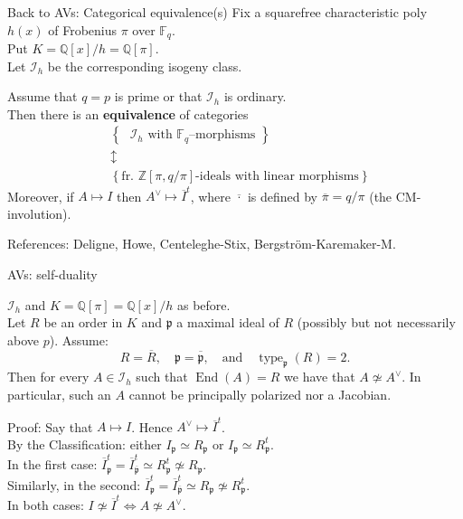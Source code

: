 \documentclass[usenames,dvipsnames,handout]{beamer}
\def\Q{\mathbb{Q}}
\def\Z{\mathbb{Z}}
\def\F{\mathbb{F}}
\DeclareMathOperator{\End}{End}
\DeclareMathOperator{\type}{type}
\newcommand{\p}{{\mathfrak p}}
\newcommand{\set}[1]{\left\lbrace#1\right\rbrace }
\begin{document}
\begin{frame}{ Back to AVs: Categorical equivalence(s) }
    Fix a squarefree characteristic poly $h(x)$ of Frobenius $\pi$ over $\F_q$.\\
    Put $K=\Q[x]/h=\Q[\pi]$.\\
    Let $\mathcal{I}_h$ be the corresponding isogeny class.
    \pause 
    \begin{theorem}
        Assume that $q=p$ is prime or that $\mathcal{I}_h$ is ordinary.\\
        \pause Then there is an {\bf equivalence} of categories
        \[
        \begin{array}{cc}
        & \set{ \text{ $\mathcal{I}_h$ with $\F_q$--morphisms } }  \\
        & \updownarrow \\ 
        & \set{ \text{fr.~$\Z[\pi,q/\pi]$-ideals with linear morphisms} }
        \end{array} 
        \]  
        \pause Moreover, if $A\mapsto I$ then $A^\vee \mapsto \overline{I}^t$, where $\overline{\cdot}$ is defined by $\overline{\pi}=q/\pi$ (the CM-involution).
    \end{theorem}
    \pause References: Deligne, Howe, Centeleghe-Stix, Bergstr\"om-Karemaker-M.
\end{frame}

\begin{frame}{ AVs: self-duality }
    \begin{theorem}[ Springer-M. ]
        $\mathcal{I}_h$ and $K=\Q[\pi]=\Q[x]/h$ as before.\\
        \pause Let $R$ be an order in $K$ and $\p$ a maximal ideal of $R$ (possibly but not necessarily above $p$). 
        \pause Assume:
        \[ R=\overline{R}, \quad \p = \overline{\p},\quad \text{and}\quad \type_\p(R) = 2 .\]
        \pause Then for every $A \in \mathcal{I}_h$ such that $\End(A)=R$ we have that $A\not\simeq A^\vee$. 
        \pause In particular, such an $A$ cannot be principally polarized nor a Jacobian.
    \end{theorem}
    \pause Proof: Say that $A \mapsto I$. Hence $A^\vee \mapsto \overline{I}^t$.\\
    \pause By the Classification: either $I_\p\simeq R_\p$ or $I_\p\simeq R_\p^t$.\\
    \pause In the first case: $\overline{I}_\p^t = \overline{I}_{\overline{\p}}^t \simeq R^t_\p \not\simeq R_\p$.\\
    \pause Similarly, in the second: $\overline{I}_\p^t = \overline{I}_{\overline{\p}}^t \simeq R_\p \not\simeq R_\p^t$.\\
    \pause In both cases: $I\not\simeq \overline{I}^t \iff A\not \simeq A^\vee$.
\end{frame}
\end{document}
